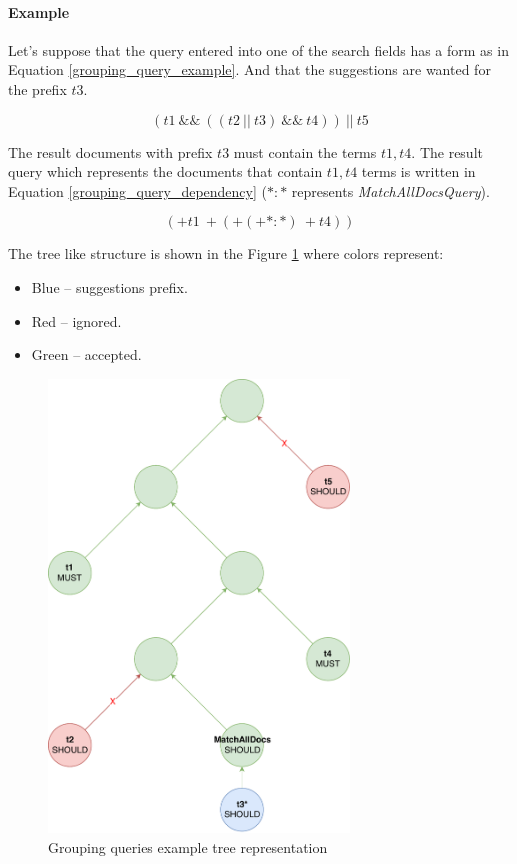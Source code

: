 \paragraph{Example}
Let's suppose that the query entered into one of the search fields has a form as in Equation \ref{grouping_query_example}.
And that the suggestions are wanted for the prefix $t3$.

\begin{equation}
\label{grouping_query_example}
(t1\ \&\&\ ((t2\ \vert\vert\ t3)\ \&\&\ t4))\ \vert\vert\ t5
\end{equation}

The result documents with prefix $t3$ must contain the terms $t1, t4$. The result query which represents the documents that
contain $t1, t4$ terms
is written in Equation \ref{grouping_query_dependency} (${*}\colon{*}$ represents \textit{MatchAllDocsQuery}).

\begin{equation}
\label{grouping_query_dependency}
({+}t1\ {+}({+}({+}{*}\colon{*})\ {+}t4))
\end{equation}

The tree like structure is shown in the Figure \ref{group_tree} where colors represent:
\begin{itemize}
    \item Blue – suggestions prefix.
    \item Red – ignored.
    \item Green – accepted.
\end{itemize}

\begin{figure}[htbp]
    \centering
    \includegraphics[width=80mm]{../img/complex_query.pdf}
    \caption{Grouping queries example tree representation}
    \label{group_tree}
\end{figure}

